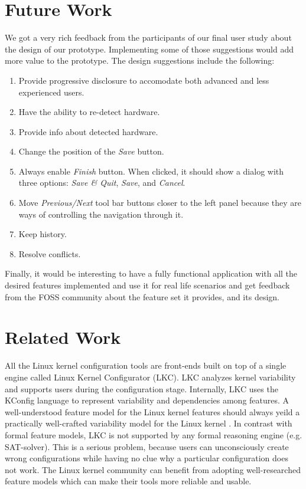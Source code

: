 \documentclass{chi2009}
\begin{document}
\section{Future Work}\label{sec:futurework}
We got a very rich feedback from the participants of our final user study about the design of our prototype. Implementing some of those suggestions would add
more value to the prototype. The design suggestions include the following:
\begin{enumerate}
 \item Provide progressive disclosure to accomodate both advanced and less experienced users.
 \item Have the ability to re-detect hardware.
 \item Provide info about detected hardware.
 \item Change the position of the \textit{Save} button.
 \item Always enable \textit{Finish} button. When clicked, it should show a dialog with three options: \textit{Save \& Quit}, \textit{Save}, and
\textit{Cancel}.
 \item Move \textit{Previous/Next} tool bar buttons closer to the left panel because they are ways of controlling the navigation through it.
 \item Keep history.
 \item Resolve conflicts.
\end{enumerate}

Finally, it would be interesting to have a fully functional application with all the desired features implemented and use it for real life scenarios and get
feedback from the FOSS community about the feature set it provides, and its design.

\section{Related Work}\label{sec:relatedwork}

All the Linux kernel configuration tools are front-ends built on top of a single engine called Linux Kernel Configurator (LKC). LKC analyzes kernel variability
and supports users during the configuration stage. Internally, LKC uses the KConfig language to represent variability and dependencies among features.
A well-understood feature model for the Linux kernel features should always yeild a practically well-crafted variability model for the Linux kernel
\cite{sincero:lkc:2008,she:kernel:2010}. In contrast with formal feature models, LKC is not supported by any formal reasoning engine (e.g. SAT-solver). This is
a serious problem, because users can unconsciously create wrong configurations while having no clue why a particular configuration does not work. The Linux
kernel community can benefit from adopting well-researched feature models which can make their tools more reliable and usable.
\end{document}
